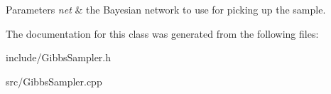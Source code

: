 \begin{DoxyParams}{Parameters}
{\em net} & the Bayesian network to use for picking up the sample. \\
\hline
\end{DoxyParams}


The documentation for this class was generated from the following files\-:\begin{DoxyCompactItemize}
\item 
include/Gibbs\-Sampler.\-h\item 
src/Gibbs\-Sampler.\-cpp\end{DoxyCompactItemize}
